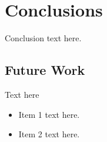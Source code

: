 \chapter{Conclusions}
\label{ch:conclusion}
\glsresetall
{
Conclusion text here.
}
\section{Future Work}
{
Text here

\begin{itemize} %
	
	\item Item 1 text here.
	
	\item Item 2 text here.

\end{itemize}
}